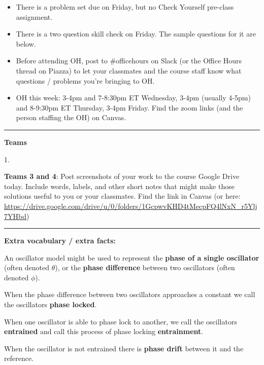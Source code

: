 \documentclass[12pt,letterpaper,noanswers]{exam}
\begin{document}
 \pdfpageheight 11in 
  \pdfpagewidth 8.5in

\noindent 
\begin{itemize}
    \item There is a problem set due on Friday, but no Check Yourself pre-class assignment.
    \item There is a two question skill check on Friday.  The sample questions for it are below.
    \item Before attending OH, post to \#officehours on Slack (or the Office Hours thread on Piazza) to let your classmates and the course staff know what questions / problems you're bringing to OH.
    \item OH this week: 3-4pm and 7-8:30pm ET Wednesday, 3-4pm (usually 4-5pm) and 8-9:30pm ET Thursday, 3-4pm Friday.  Find the zoom links (and the person staffing the OH) on Canvas.
\end{itemize}

\hrule
\vspace{0.2cm}

\noindent\textbf{Teams}

\begin{multicols}{2}
1. 
\end{multicols}

\noindent \textbf{Teams 3 and 4}: Post screenshots of your work to the course Google Drive today.  Include words, labels, and other short notes that might make those solutions useful to you or your classmates.  Find the link in Canvas (or here: \url{https://drive.google.com/drive/u/0/folders/1GcpwvKHD4tMecpFQ4lNxN_r5Ylj7YHbd})

\vspace{0.2cm}
\hrule
\vspace{0.2cm}


\noindent \textbf{Extra vocabulary / extra facts:}
\begin{tcolorbox}
An oscillator model might be used to represent the \textbf{phase of a single oscillator} (often denoted $\theta$), or the \textbf{phase difference} between two oscillators (often denoted $\phi$).

When the phase difference between two oscillators approaches a constant we call the oscillators \textbf{phase locked}.

When one oscillator is able to phase lock to another, we call the oscillators \textbf{entrained} and call this process of phase locking \textbf{entrainment}.

When the oscillator is not entrained there is \textbf{phase drift} between it and the reference.


\end{tcolorbox}
\end{document}
